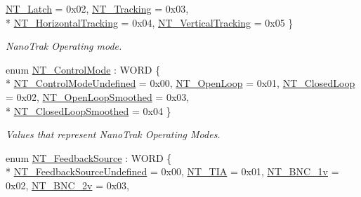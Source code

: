 \begin{DoxyCompactItemize}
\hyperlink{group___common_ggab868c9a5ae40544a9debc2e28cdef1a8a390a5a599f9f230d8c4e82bd9779f44d}{N\+T\+\_\+\+Latch} = 0x02, 
\hyperlink{group___common_ggab868c9a5ae40544a9debc2e28cdef1a8a9699780111fb6007b9a82f3b69f72b04}{N\+T\+\_\+\+Tracking} = 0x03, 
\\*
\hyperlink{group___common_ggab868c9a5ae40544a9debc2e28cdef1a8ab0741d9335021c1241584f9ac3991f9d}{N\+T\+\_\+\+Horizontal\+Tracking} = 0x04, 
\hyperlink{group___common_ggab868c9a5ae40544a9debc2e28cdef1a8a2bb89b6bb094ee95b0d6328d4c33dd11}{N\+T\+\_\+\+Vertical\+Tracking} = 0x05
 \}\begin{DoxyCompactList}\small\item\em Nano\+Trak Operating mode. \end{DoxyCompactList}
\item 
enum \hyperlink{group___common_gafe8ff923e94424207dcf44a4e429e26d}{N\+T\+\_\+\+Control\+Mode} \+: W\+O\+RD \{ \\*
\hyperlink{group___common_ggafe8ff923e94424207dcf44a4e429e26daa8251cba8a0547011994a9c990bfc874}{N\+T\+\_\+\+Control\+Mode\+Undefined} = 0x00, 
\hyperlink{group___common_ggafe8ff923e94424207dcf44a4e429e26dabcf6c5fbf5af8f8a923c75de3bd5aa37}{N\+T\+\_\+\+Open\+Loop} = 0x01, 
\hyperlink{group___common_ggafe8ff923e94424207dcf44a4e429e26da3e0b7f5856b67d2924508faa949d87a0}{N\+T\+\_\+\+Closed\+Loop} = 0x02, 
\hyperlink{group___common_ggafe8ff923e94424207dcf44a4e429e26da433880ad2f4c2c0151f1f2823f2c8b71}{N\+T\+\_\+\+Open\+Loop\+Smoothed} = 0x03, 
\\*
\hyperlink{group___common_ggafe8ff923e94424207dcf44a4e429e26da105629caba97bd5f3563909fbfc199df}{N\+T\+\_\+\+Closed\+Loop\+Smoothed} = 0x04
 \}\begin{DoxyCompactList}\small\item\em Values that represent Nano\+Trak Operating Modes. \end{DoxyCompactList}
\item 
enum \hyperlink{group___common_ga603b9807ada27df33a5ff4a7d293e40c}{N\+T\+\_\+\+Feedback\+Source} \+: W\+O\+RD \{ \\*
\hyperlink{group___common_gga603b9807ada27df33a5ff4a7d293e40ca820984084f314cd882adc25320bde696}{N\+T\+\_\+\+Feedback\+Source\+Undefined} = 0x00, 
\hyperlink{group___common_gga603b9807ada27df33a5ff4a7d293e40caaac98743aa773a6f7099af720ed68468}{N\+T\+\_\+\+T\+IA} = 0x01, 
\hyperlink{group___common_gga603b9807ada27df33a5ff4a7d293e40ca32f530a707f3f68a855bccbdc4eec7bd}{N\+T\+\_\+\+B\+N\+C\+\_\+1v} = 0x02, 
\hyperlink{group___common_gga603b9807ada27df33a5ff4a7d293e40ca7581d8ea7ad5ec5057d21aae9feebeaa}{N\+T\+\_\+\+B\+N\+C\+\_\+2v} = 0x03, 

\end{DoxyCompactItemize}

